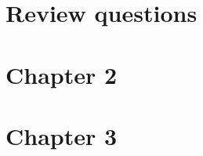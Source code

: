 \documentclass[10pt]{IEEEtran}
\begin{document}
\maketitle


\begin{enumerate}
\section*{Review questions}



\section*{Chapter 2}



\section*{Chapter 3}



\end{enumerate}
\end{document}

